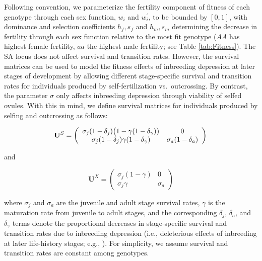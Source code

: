 \documentclass[11pt]{article}
\def\mbf#1{\mathbf{#1}}
\begin{document}
Following convention, we parameterize the fertility component of fitness of each genotype through each sex function, $w_{i}$ and $w^{\prime}_{i}$, to be bounded by $[0,1]$, with dominance and selection coefficients $h_f, s_f$ and $h_m, s_m$ determining the decrease in fertility through each sex function relative to the most fit genotype ($AA$ has highest female fertility, $aa$ the highest male fertility; see Table \ref{tab:Fitness}). The SA locus does not affect survival and transition rates. However, the survival matrices can be used to model the fitness effects of inbreeding depression at later stages of development by allowing different stage-specific survival and transition rates for individuals produced by self-fertilization vs.~outcrossing. By contrast, the parameter $\sigma$ only affects inbreeding depression through viability of selfed ovules. With this in mind, we define survival matrices for individuals produced by selfing and outcrossing as follows:
\begin{linenomath*}
\begin{equation} \label{eq:US}
	\mbf{U}^S = \left(
					\begin{array}{cc}
						\sigma_j (1 - \delta_j) \big(1 - \gamma (1 - \delta_{\gamma}) \big) & 0 \\
						\sigma_j (1 - \delta_j) \gamma (1 - \delta_{\gamma})      & \sigma_a (1 - \delta_a)
					\end{array}
				\right) \\
\end{equation}
\end{linenomath*}
\noindent and 
\begin{linenomath*}
\begin{equation}\label{eq:UX}
	\mbf{U}^X = \left(
					\begin{array}{cc}
						\sigma_j(1 - \gamma) & 0 \\
						\sigma_j \gamma      & \sigma_a
					\end{array}
				\right)
\end{equation}
\end{linenomath*}

\noindent where $\sigma_j$ and $\sigma_a$ are the juvenile and adult stage survival rates, $\gamma$ is the maturation rate from juvenile to adult stages, and the corresponding $\delta_j$, $\delta_a$, and $\delta_{\gamma}$ terms denote the proportional decreases in stage-specific survival and transition rates due to inbreeding depression (i.e., deleterious effects of inbreeding at later life-history stages; e.g., \citealt{HarderRoutely2006}). For simplicity, we assume survival and transition rates are constant among genotypes. 
\end{document}
